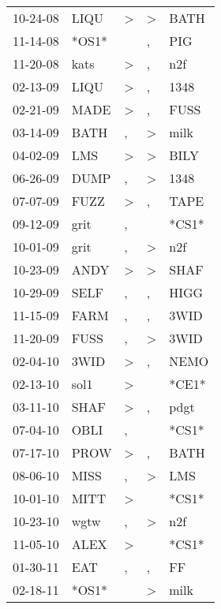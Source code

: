 \begin{supertabular}{lllll}
 10-24-08 &   LIQU &  \textgreater &  \textgreater &   BATH \\
 11-14-08 &  *OS1* &               &             , &    PIG \\
 11-20-08 &   kats &  \textgreater &             , &    n2f \\
 02-13-09 &   LIQU &  \textgreater &             , &   1348 \\
 02-21-09 &   MADE &  \textgreater &             , &   FUSS \\
 03-14-09 &   BATH &             , &  \textgreater &   milk \\
 04-02-09 &    LMS &  \textgreater &  \textgreater &   BILY \\
 06-26-09 &   DUMP &             , &  \textgreater &   1348 \\
 07-07-09 &   FUZZ &  \textgreater &             , &   TAPE \\
 09-12-09 &   grit &             , &               &  *CS1* \\
 10-01-09 &   grit &             , &  \textgreater &    n2f \\
 10-23-09 &   ANDY &  \textgreater &  \textgreater &   SHAF \\
 10-29-09 &   SELF &             , &             , &   HIGG \\
 11-15-09 &   FARM &             , &             , &   3WID \\
 11-20-09 &   FUSS &             , &  \textgreater &   3WID \\
 02-04-10 &   3WID &  \textgreater &             , &   NEMO \\
 02-13-10 &   sol1 &  \textgreater &               &  *CE1* \\
 03-11-10 &   SHAF &  \textgreater &             , &   pdgt \\
 07-04-10 &   OBLI &             , &               &  *CS1* \\
 07-17-10 &   PROW &  \textgreater &             , &   BATH \\
 08-06-10 &   MISS &             , &  \textgreater &    LMS \\
 10-01-10 &   MITT &  \textgreater &               &  *CS1* \\
 10-23-10 &   wgtw &             , &  \textgreater &    n2f \\
 11-05-10 &   ALEX &  \textgreater &               &  *CS1* \\
 01-30-11 &    EAT &             , &             , &     FF \\
 02-18-11 &  *OS1* &               &  \textgreater &   milk \\

\end{supertabular}
